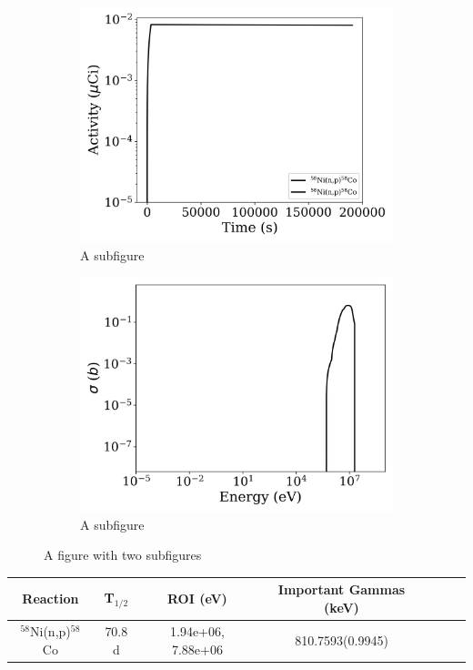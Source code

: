 \begin{figure}[h]
\centering
\begin{subfigure}{.5\textwidth}
  \centering
     \includegraphics[width=.8\textwidth]{plot/Ni-58(n,p)Co-58_library1} 

  \caption{A subfigure}
  \label{fig:sub1}
\end{subfigure}%
\begin{subfigure}{.5\textwidth}
  \centering
     \includegraphics[width=.8\textwidth]{plot/Ni-58(n,p)Co-58} 

  \caption{A subfigure}
  \label{fig:sub2}
\end{subfigure}
\caption{A figure with two subfigures}
\label{fig:test}
\end{figure}

\begin{table}[h]
\centering
\begin{tabular}{ |c|c|c|c|c|c|c| }
 \hline
 Reaction & T$_{1/2}$ & ROI (eV) & Important Gammas (keV) \\
 \hline 
 $^{58}$Ni(n,p)$^{58}$Co & 70.8 d & 1.94e+06, 7.88e+06 & 810.7593(0.9945) \\ 
\hline
\end{tabular}
\end{table}
